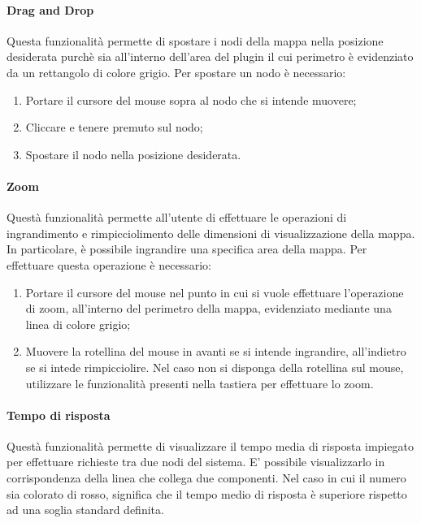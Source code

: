     \paragraph {Drag and Drop} \Spazio
Questa funzionalità permette di spostare i nodi della mappa nella posizione desiderata purchè sia all'interno dell'area del plugin il cui perimetro è evidenziato da un rettangolo di colore grigio.
Per spostare un nodo è necessario: 
\begin{enumerate}
	
	\item Portare il cursore del mouse sopra al nodo che si intende muovere;
	\item Cliccare e tenere premuto sul nodo;
	\item Spostare il nodo nella posizione desiderata.
	
\end{enumerate}

\paragraph{Zoom} \Spazio
Questà funzionalità permette all'utente di effettuare le operazioni di ingrandimento e rimpicciolimento delle dimensioni di visualizzazione della mappa. In particolare, è possibile ingrandire una specifica area della mappa.
Per effettuare questa operazione è necessario:

\begin{enumerate}
	
	\item Portare il cursore del mouse nel punto in cui si vuole effettuare l'operazione di zoom, all'interno del perimetro della mappa, evidenziato mediante una linea di colore grigio;
	\item Muovere la rotellina del mouse in avanti se si intende ingrandire, all'indietro se si intede rimpicciolire. Nel caso non si disponga della rotellina sul mouse, utilizzare le funzionalità presenti nella tastiera per effettuare lo zoom.
	
\end{enumerate}

\paragraph{Tempo di risposta} \Spazio
Questà funzionalità permette di visualizzare il tempo media di risposta impiegato per effettuare richieste tra due nodi del sistema.
E' possibile visualizzarlo in corrispondenza della linea che collega due componenti.
Nel caso in cui il numero sia colorato di rosso, significa che il tempo medio di risposta è superiore rispetto ad una soglia standard definita.




